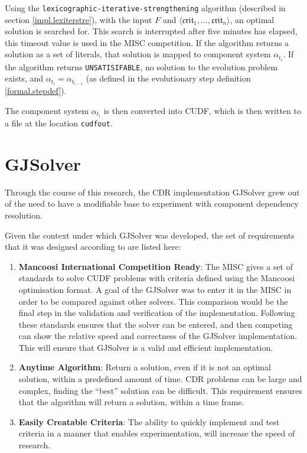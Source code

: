 Using the \texttt{lexicographic-iterative-strengthening} algorithm (described in section \ref{impl.lexiterstre}),
with the input $F$ and $\langle \mathfrak{crit}_1, \ldots ,\mathfrak{crit}_n \rangle$, an optimal solution is searched for.
This search is interrupted after five minutes has elapsed, this timeout value is used in the MISC competition.
If the algorithm returns a solution as a set of literals, that solution is mapped to component system $\alpha_{t_i}$.
If the algorithm returns \texttt{UNSATISIFABLE}, no solution to the evolution problem exists, and $\alpha_{t_i} = \alpha_{t_{i-1}}$ 
(as defined in the evolutionary step definition \ref{formal.stepdef}).

The component system $\alpha_{t_i}$ is then converted into CUDF, which is then written to a file at the location \verb+cudfout+.

\section{GJSolver}
\label{impl.gjsolver}
Through the course of this research, the CDR implementation GJSolver grew out of the need to have a modifiable base to experiment with component dependency resolution.

Given the context under which GJSolver was developed, the set of requirements that it was designed according to are listed here:
\begin{enumerate}
  \item \textbf{Mancoosi International Competition Ready}: The MISC gives a set of standards to solve CUDF problems with criteria defined using the Mancoosi optimisation format.
  A goal of the GJSolver was to enter it in the MISC in order to be compared against other solvers.
  This comparison would be the final step in the validation and verification of the implementation.
  Following these standards ensures that the solver can be entered, and then competing can show the relative speed and correctness of the GJSolver implementation.
  This will ensure that GJSolver is a valid and efficient implementation. 
  \item \textbf{Anytime Algorithm}: Return a solution, even if it is not an optimal solution, within a predefined amount of time. 
  CDR problems can be large and complex, finding the ``best'' solution can be difficult. 
  This requirement ensures that the algorithm will return a solution, within a time frame.
  \item \textbf{Easily Creatable Criteria}: The ability to quickly implement and test criteria in a manner that enables experimentation, will increase the speed of research.
\end{enumerate}


